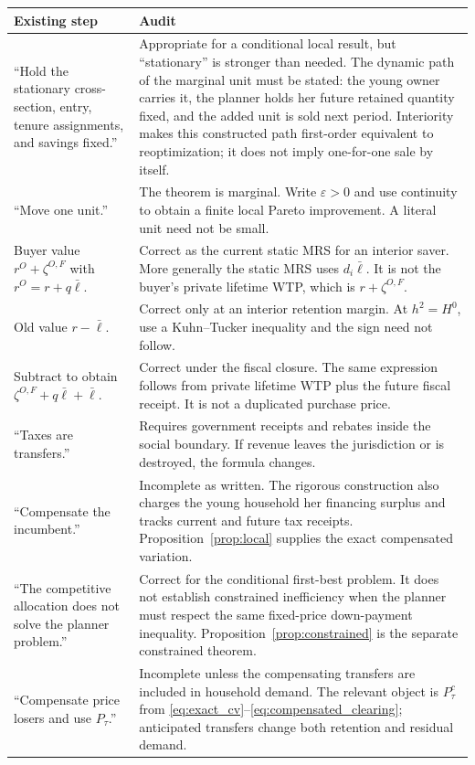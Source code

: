 \documentclass[11pt]{article}
\newcommand{\1}{\mathbf 1}
\newcommand{\ellbar}{\bar\ell}
\begin{document}
\begin{center}
\renewcommand{\arraystretch}{1.17}
\begin{tabularx}{\textwidth}{@{}L{0.30\textwidth}Y@{}}
\toprule
Existing step & Audit \\
\midrule
``Hold the stationary cross-section, entry, tenure assignments, and savings
fixed.''
& Appropriate for a conditional local result, but ``stationary'' is stronger
than needed. The dynamic path of the marginal unit must be stated: the young
owner carries it, the planner holds her future retained quantity fixed, and
the added unit is sold next period. Interiority makes this constructed path
first-order equivalent to reoptimization; it does not imply one-for-one sale
by itself. \\
``Move one unit.''
& The theorem is marginal. Write $\varepsilon>0$ and use continuity to obtain a
finite local Pareto improvement. A literal unit need not be small. \\
Buyer value $r^O+\zeta^{O,F}$ with $r^O=r+q\ellbar$.
& Correct as the current static MRS for an interior saver. More generally the
static MRS uses $d_i\ellbar$. It is not the buyer's private lifetime WTP, which
is $r+\zeta^{O,F}$. \\
Old value $r-\ellbar$.
& Correct only at an interior retention margin. At $h^2=H^0$, use a
Kuhn--Tucker inequality and the sign need not follow. \\
Subtract to obtain $\zeta^{O,F}+q\ellbar+\ellbar$.
& Correct under the fiscal closure. The same expression follows from private
lifetime WTP plus the future fiscal receipt. It is not a duplicated purchase
price. \\
``Taxes are transfers.''
& Requires government receipts and rebates inside the social boundary. If
revenue leaves the jurisdiction or is destroyed, the formula changes. \\
``Compensate the incumbent.''
& Incomplete as written. The rigorous construction also charges the young
household her financing surplus and tracks current and future tax receipts.
Proposition~\ref{prop:local} supplies the exact compensated variation. \\
``The competitive allocation does not solve the planner problem.''
& Correct for the conditional first-best problem. It does not establish
constrained inefficiency when the planner must respect the same fixed-price
down-payment inequality. Proposition~\ref{prop:constrained} is the separate
constrained theorem. \\
``Compensate price losers and use $P_\tau$.''
& Incomplete unless the compensating transfers are included in household
demand. The relevant object is $P_\tau^c$ from
\eqref{eq:exact_cv}--\eqref{eq:compensated_clearing}; anticipated transfers
change both retention and residual demand. \\
\bottomrule
\end{tabularx}
\end{center}
\end{document}
